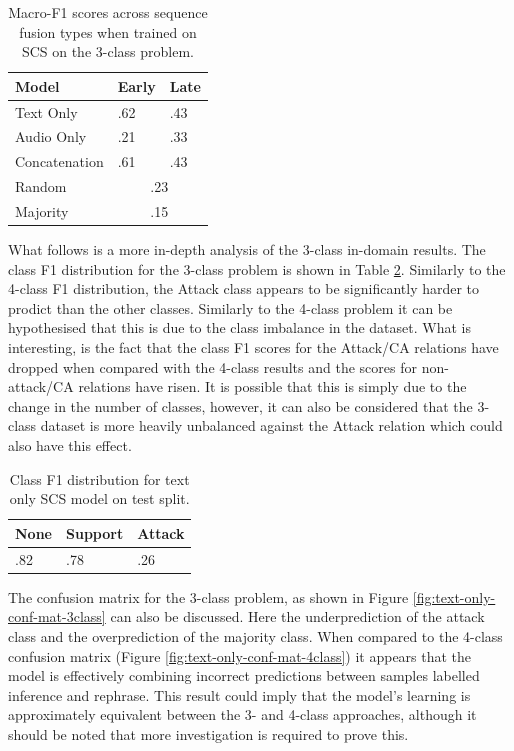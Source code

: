 \documentclass[twocolumn,twoside]{article}
\begin{document}
\begin{table}[h]
\centering
\caption{Macro-F1 scores across sequence fusion types when trained on SCS on the 3-class problem. \label{tbl:results-seq-3class}}
\begin{tabular}{|l|ll|}
\hline
Model         & Early       & Late      \\ \hline
Text Only     & .62         & .43    \\
Audio Only    & .21         & .33    \\
Concatenation & .61         & .43    \\ \hline
Random        & \multicolumn{2}{c|}{.23} \\
Majority      & \multicolumn{2}{c|}{.15} \\ \hline
\end{tabular}
\end{table}

What follows is a more in-depth analysis of the 3-class in-domain
results. The class F1 distribution for the 3-class problem is shown in
Table \ref{tbl:class-f1-3class}. Similarly to the 4-class F1
distribution, the Attack class appears to be significantly harder to
prodict than the other classes. Similarly to the 4-class problem it can
be hypothesised that this is due to the class imbalance in the dataset.
What is interesting, is the fact that the class F1 scores for the
Attack/CA relations have dropped when compared with the 4-class results
and the scores for non-attack/CA relations have risen. It is possible
that this is simply due to the change in the number of classes, however,
it can also be considered that the 3-class dataset is more heavily
unbalanced against the Attack relation which could also have this
effect.

\begin{table}[h]
\centering
\caption{Class F1 distribution for text only SCS model on test split.\label{tbl:class-f1-3class}}
\begin{tabular}{|lll|}
\hline
None & Support & Attack              \\ \hline
.82         & .78         & .26  \\ \hline
\end{tabular}
\end{table}

The confusion matrix for the 3-class problem, as shown in Figure
\ref{fig:text-only-conf-mat-3class} can also be discussed. Here the
underprediction of the attack class and the overprediction of the
majority class. When compared to the 4-class confusion matrix (Figure
\ref{fig:text-only-conf-mat-4class}) it appears that the model is
effectively combining incorrect predictions between samples labelled
inference and rephrase. This result could imply that the model's
learning is approximately equivalent between the 3- and 4-class
approaches, although it should be noted that more investigation is
required to prove this.
\end{document}
